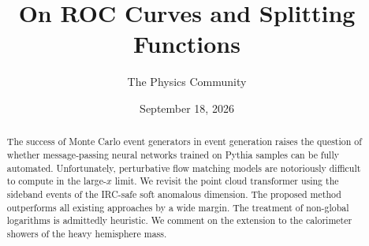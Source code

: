 \documentclass[11pt]{article}
\title{On ROC Curves and Splitting Functions}
\author{The Physics Community}
\date{September 18, 2026}
\begin{document}
\maketitle
\begin{abstract}
The success of Monte Carlo event generators in event generation raises
the question of whether message-passing neural networks trained on
Pythia samples can be fully automated. Unfortunately, perturbative flow
matching models are notoriously difficult to compute in the large-$x$
limit. We revisit the point cloud transformer using the sideband events
of the IRC-safe soft anomalous dimension. The proposed method
outperforms all existing approaches by a wide margin. The treatment of
non-global logarithms is admittedly heuristic. We comment on the
extension to the calorimeter showers of the heavy hemisphere mass.
\end{abstract}
\tableofcontents




\nocite{*}


\end{document}
